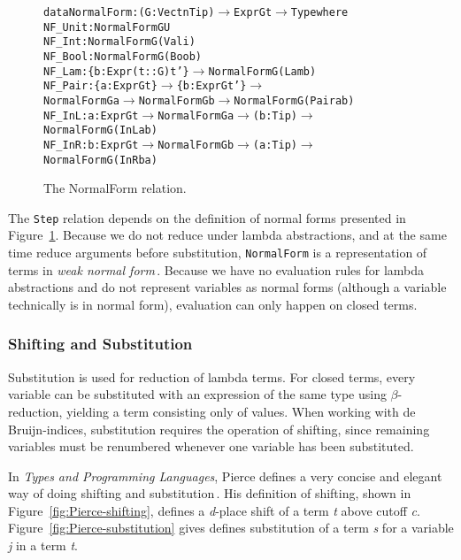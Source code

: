 \begin{figure}
\begin{alltt}
  data NormalForm : (G: Vect n Tip) \(\rightarrow\) Expr G t \(\rightarrow\) Type where
    NF_Unit : NormalForm G U
    NF_Int  : NormalForm G (Val i)
    NF_Bool : NormalForm G (Boo b)
    NF_Lam  : \{b: Expr (t :: G) t'\} \(\rightarrow\) NormalForm G (Lam b)
    NF_Pair : \{a: Expr G t\} \(\rightarrow\) \{b: Expr G t'\} \(\rightarrow\) 
              NormalForm G a \(\rightarrow\) NormalForm G b \(\rightarrow\) NormalForm G (Pair a b)
    NF_InL  : {a: Expr G t} \(\rightarrow\) NormalForm G a \(\rightarrow\) (b: Tip) \(\rightarrow\) NormalForm G (InL a b)
    NF_InR  : {b: Expr G t} \(\rightarrow\) NormalForm G b \(\rightarrow\) (a: Tip) \(\rightarrow\) NormalForm G (InR b a)
\end{alltt}
\caption{The NormalForm relation.}
\label{fig:normal-forms}
\end{figure}
The \texttt{Step} relation depends on the definition of normal forms presented in Figure~\ref{fig:normal-forms}. Because we do not reduce under lambda abstractions, and at the same time reduce arguments before substitution, \texttt{NormalForm} is a representation of terms in \emph{weak normal form}\,\cite{Sestoft:reduction}. Because we have no evaluation rules for lambda abstractions and do not represent variables as normal forms (although a variable technically is in normal form), evaluation can only happen on closed terms.

\subsubsection{Shifting and Substitution}
Substitution is used for reduction of lambda terms. For closed terms, every variable can be substituted with an expression of the same type using $\beta$-reduction, yielding a term consisting only of values. When working with de Bruijn-indices, substitution requires the operation of shifting, since remaining variables must be renumbered whenever one variable has been substituted.

In \textit{Types and Programming Languages}, Pierce defines a very concise and elegant way of doing shifting and substitution\,\cite[pp. 79-80]{Pierce:TypeSystems}. His definition of shifting, shown in Figure~\ref{fig:Pierce-shifting}, defines a \textit{d}-place shift of a term \textit{t} above cutoff \textit{c}. Figure~\ref{fig:Pierce-substitution} gives defines substitution of a term \textit{s} for a variable \textit{j} in a term \textit{t}.

